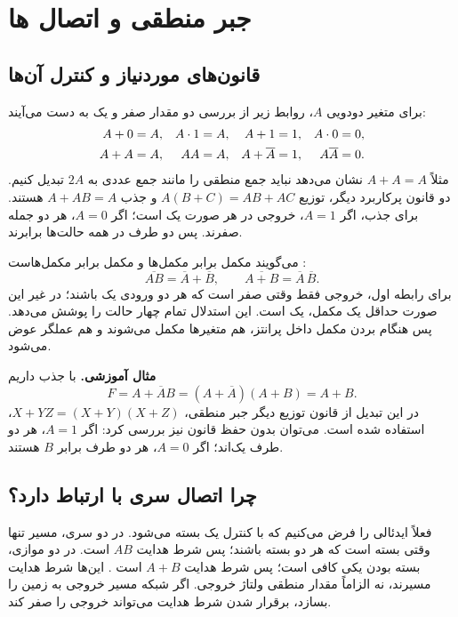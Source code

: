 \section{جبر منطقی و اتصال ها}
\subsection{قانون‌های موردنیاز و کنترل آن‌ها}
برای متغیر دودویی \(A\)، روابط زیر از بررسی دو مقدار صفر و یک به دست می‌آیند:
\begin{align}
A+0&=A,& A\cdot1&=A,& A+1&=1,& A\cdot0&=0,\notag\\
A+A&=A,& AA&=A,& A+\overline{A}&=1,& A\overline{A}&=0.
\label{eq:foundation-identities}
\end{align}
مثلاً \(A+A=A\) نشان می‌دهد نباید جمع منطقی را مانند جمع عددی
به \(2A\) تبدیل کنیم.
دو قانون پرکاربرد دیگر، توزیع \(A(B+C)=AB+AC\) و جذب
\(A+AB=A\) هستند. برای جذب، اگر \(A=1\)، خروجی در هر صورت یک است؛
اگر \(A=0\)، هر دو جمله صفرند. پس دو طرف در همه حالت‌ها برابرند.

 می‌گویند مکمل  برابر  مکمل‌ها و
مکمل  برابر  مکمل‌هاست \cite[بخش ]{weste}:
\begin{equation}\label{eq:foundation-demorgan}
\overline{AB}=\overline{A}+\overline{B},\qquad
\overline{A+B}=\overline{A}\,\overline{B}.
\end{equation}
برای رابطه اول، خروجی فقط وقتی صفر است که هر دو ورودی یک باشند؛
در غیر این صورت حداقل یک مکمل، یک است. این استدلال تمام چهار حالت را پوشش می‌دهد.
پس هنگام بردن مکمل داخل پرانتز، هم متغیرها مکمل می‌شوند و هم عملگر عوض می‌شود.

\textbf{مثال آموزشی.} با جذب داریم
\[
 F=A+\overline{A}B=(A+\overline{A})(A+B)=A+B.
\]
در این تبدیل از قانون توزیع دیگر جبر منطقی،
\(X+YZ=(X+Y)(X+Z)\)، استفاده شده است.
می‌توان بدون حفظ قانون نیز بررسی کرد: اگر \(A=1\)، هر دو طرف یک‌اند؛
اگر \(A=0\)، هر دو طرف برابر \(B\) هستند.

\subsection{چرا اتصال سری با  ارتباط دارد؟}
فعلاً  ایدئالی را فرض می‌کنیم که با کنترل یک بسته می‌شود.
در دو  سری، مسیر تنها وقتی بسته است که هر دو بسته باشند؛
پس شرط هدایت \(AB\) است. در دو  موازی، بسته بودن یکی کافی است؛
پس شرط هدایت \(A+B\) است \cite[اسلاید ۲۲]{intro}.
این‌ها شرط هدایت مسیرند، نه الزاماً مقدار منطقی ولتاژ خروجی.
اگر شبکه مسیر خروجی به زمین را بسازد، برقرار شدن شرط هدایت می‌تواند خروجی را صفر کند.

